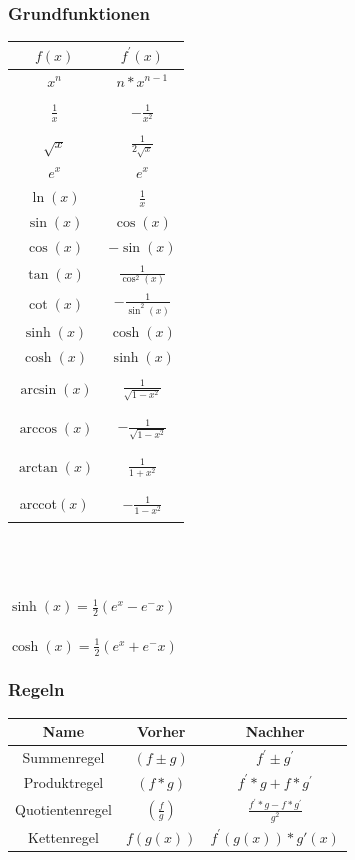 \documentclass[12pt,a4paper]{article}
\begin{document}
		\subsubsection{Grundfunktionen}
			\begin{tabular}{c|c}
				 \hline
				$f(x)$ & $f^{'}(x)$ \\
				\hline
				$x^{n}$ & $n*x^{n-1}$ \\
				\hline\\
				$\frac{1}{x}$ & $- \frac{1}{x^2}$ \\\\
				\hline
				$\sqrt{x}$ & $\frac{1}{2\sqrt{x}}$\\
				\hline
				$e^{x}$ & $e^{x}$ \\
				\hline
				$\ln(x)$ & $\frac{1}{x}$ \\
				\hline
				$\sin{(x)}$ & $\cos{(x)}$ \\
				\hline
				$\cos{(x)}$ & $-\sin{(x)}$ \\
				\hline 
				$\tan{(x)}$ & $\frac{1}{\cos^2(x)}$\\
				\hline 
				$\cot{(x)}$ & $-\frac{1}{\sin^2(x)}$\\
				\hline
				$\sinh{(x)}$ & $\cosh{(x)}$ \\
				\hline
				$\cosh{(x)}$ & $\sinh{(x)}$ \\
				\hline\\
				$\arcsin(x)$ & $\frac{1}{\sqrt{1-x^2}}$\\\\
				\hline\\
				$\arccos(x)$ & $-\frac{1}{\sqrt{1-x^2}}$\\\\
				\hline\\
				$\arctan(x)$ & $\frac{1}{1+x^2}$\\\\
				\hline\\
				arccot$(x)$ & $-\frac{1}{1-x^2}$\\\\
			\end{tabular}\\\\\\
			$\sinh{(x)} = \frac{1}{2}(e^x-e^-x)$ \\\\
			$\cosh{(x)} = \frac{1}{2}(e^x+e^-x)$ 

		\subsubsection{Regeln}
			\begin{tabular}{|c|c|c|}
				 \hline
				Name & Vorher & Nachher \\
				\hline
				Summenregel & $(f\pm g)$ & $f^{'} \pm g^{'}$ \\
				\hline
				Produktregel & $(f*g)$ & $f^{'} *g + f* g^{'}$ \\
				\hline
				Quotientenregel & $(\frac{f}{g})$ & $\frac{f^{'}*g-f*g^{'}}{g^{2}}$ \\
				\hline
				Kettenregel & $f(g(x))$ & $f^{'}(g(x))*g'(x)$ \\
				\hline
			\end{tabular}
\end{document}
